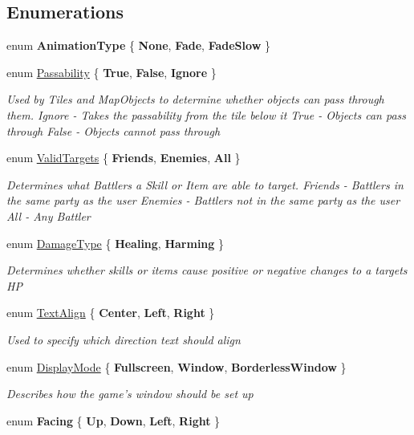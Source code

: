 \subsection*{Enumerations}
\begin{DoxyCompactItemize}
\item 
enum {\bfseries Animation\-Type} \{ {\bfseries None}, 
{\bfseries Fade}, 
{\bfseries Fade\-Slow}
 \}
\item 
enum \hyperlink{namespace_simple_r_p_g_a5f1ec21e7f4e36278a6cedd38c51e650}{Passability} \{ {\bfseries True}, 
{\bfseries False}, 
{\bfseries Ignore}
 \}
\begin{DoxyCompactList}\small\item\em Used by Tiles and Map\-Objects to determine whether objects can pass through them. Ignore -\/ Takes the passability from the tile below it True -\/ Objects can pass through False -\/ Objects cannot pass through \end{DoxyCompactList}\item 
enum \hyperlink{namespace_simple_r_p_g_af69ad1f922e177c5a1cd81b2c0f2c8ce}{Valid\-Targets} \{ {\bfseries Friends}, 
{\bfseries Enemies}, 
{\bfseries All}
 \}
\begin{DoxyCompactList}\small\item\em Determines what Battlers a Skill or Item are able to target. Friends -\/ Battlers in the same party as the user Enemies -\/ Battlers not in the same party as the user All -\/ Any Battler \end{DoxyCompactList}\item 
enum \hyperlink{namespace_simple_r_p_g_aa7bf94f037fcccbe428edca5e36bec67}{Damage\-Type} \{ {\bfseries Healing}, 
{\bfseries Harming}
 \}
\begin{DoxyCompactList}\small\item\em Determines whether skills or items cause positive or negative changes to a targets H\-P \end{DoxyCompactList}\item 
enum \hyperlink{namespace_simple_r_p_g_a956c6a011833191ccb1b0aa38a1d5916}{Text\-Align} \{ {\bfseries Center}, 
{\bfseries Left}, 
{\bfseries Right}
 \}
\begin{DoxyCompactList}\small\item\em Used to specify which direction text should align \end{DoxyCompactList}\item 
enum \hyperlink{namespace_simple_r_p_g_a52ff6b4f812beca5f07344ae6652c1b4}{Display\-Mode} \{ {\bfseries Fullscreen}, 
{\bfseries Window}, 
{\bfseries Borderless\-Window}
 \}
\begin{DoxyCompactList}\small\item\em Describes how the game's window should be set up \end{DoxyCompactList}\item 
enum {\bfseries Facing} \{ {\bfseries Up}, 
{\bfseries Down}, 
{\bfseries Left}, 
{\bfseries Right}
 \}
\end{DoxyCompactItemize}


